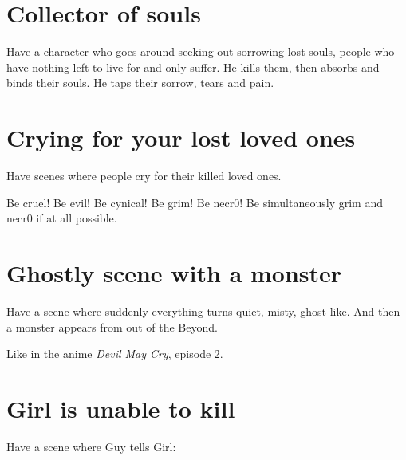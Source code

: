 \section{Collector of souls}
Have a character who goes around seeking out sorrowing lost souls, people who have nothing left to live for and only suffer. He kills them, then absorbs and binds their souls. He taps their sorrow, tears and pain. 
















\section{Crying for your lost loved ones}
Have scenes where people cry for their killed loved ones. 

Be cruel! Be evil! Be cynical! Be grim! Be necr0! Be simultaneously grim and necr0 if at all possible. 















\section{Ghostly scene with a monster}
Have a scene where suddenly everything turns quiet, misty, ghost-like. And then a monster appears from out of the Beyond. 

Like in the anime \emph{Devil May Cry}, episode 2. 















\section{Girl is unable to kill}
Have a scene where Guy tells Girl: 

